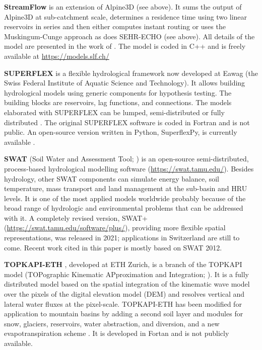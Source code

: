\documentclass[10pt,a4paper]{article}
\begin{document}
\textbf{StreamFlow} is an extension of Alpine3D (see above). It sums the output of Alpine3D at sub-catchment scale, determines a residence time using two linear reservoirs in series \citep{Comola2015} and then either computes instant routing or uses the Muskingum-Cunge approach as does SEHR-ECHO (see above). All details of the model are presented in the work of \citet{Gallice2016}. The model is coded in C++ and is freely available at \url{https://models.slf.ch/}

\textbf{SUPERFLEX} \citep{Fenicia2011a, Kavetski2011} is a flexible hydrological framework now developed at Eawag (the Swiss Federal Institute of Aquatic Science and Technology). It allows building hydrological models using generic components for hypothesis testing. The building blocks are reservoirs, lag functions, and connections. The models elaborated with SUPERFLEX can be lumped, semi-distributed \citep{Fenicia2016} or fully distributed \citep{Hostache2020}. The original SUPERFLEX software is coded in Fortran and is not public. An open-source version written in Python, SuperflexPy, is currently available \citep{DalMolin2020a}.

\textbf{SWAT} (Soil Water and Assessment Tool; \citealp{Arnold1998}) is an open-source semi-distributed, process-based hydrological modelling software (\url{https://swat.tamu.edu/}). Besides hydrology, other SWAT components can simulate energy balance, soil temperature, mass transport and land management at the sub-basin and HRU levels. It is one of the most applied models worldwide probably because of the broad range of hydrologic and environmental problems that can be addressed with it. A completely revised version, SWAT+ (\url{https://swat.tamu.edu/software/plus/}), providing more flexible spatial representations, was released in 2021; applications in Switzerland are still to come. Recent work cited in this paper is mostly based on SWAT 2012.

\textbf{TOPKAPI-ETH} \citep{Finger2011, Ragettli2012}, developed at ETH Zurich, is a branch of the TOPKAPI model (TOPographic Kinematic APproximation and Integration; \citealp{Todini1995, Todini2002, Liu2002, Ciarapica2002}).  It is a fully distributed model based on the spatial integration  of the kinematic wave model over the pixels of the digital elevation model (DEM) and resolves vertical and lateral water fluxes at the pixel-scale. TOPKAPI-ETH has been modified for application to mountain basins by adding a second soil layer and modules for snow, glaciers, reservoirs, water abstraction, and diversion, and a new evapotranspiration scheme \citep{Finger2011, Finger2012, Fatichi2015}. It is developed in Fortan and is not publicly available.
\end{document}
